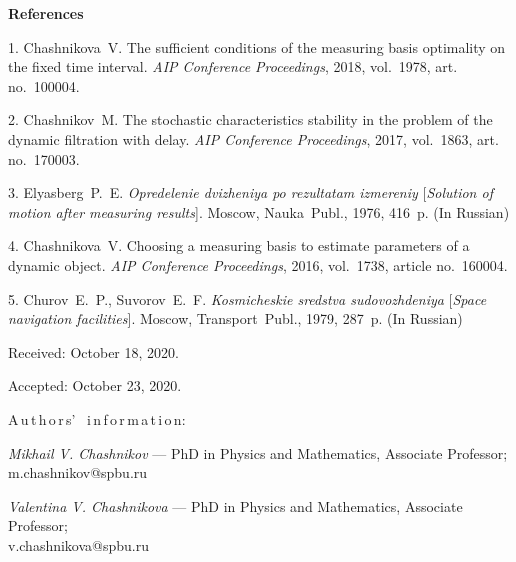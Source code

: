 

{\small



\vskip6mm

\noindent \textbf{References} }

\vskip 2mm

{\footnotesize



1. {\textnormal Chashnikova~V.} The sufficient conditions of the
measuring basis optimality on the fixed time interval.  {\itshape
AIP Conference Proceedings}, 2018, vol.~1978, art. no.~100004.

2. {\textnormal Chashnikov~M.} The stochastic characteristics
stability in the problem of the dynamic filtration with delay.
{\itshape AIP Conference Proceedings}, 2017, vol.~1863, art.
no.~170003.

3. {\textnormal Elyasberg~P.~E.} {\itshape Opredelenie dvizheniya
po rezultatam izmereniy} [{\itshape Solution of motion after
measuring results}]. Moscow, Nauka~Publ., 1976, 416~p. (In
Russian)

4. {\textnormal Chashnikova~V.} Choosing a measuring basis to
estimate parameters of a dynamic object.  {\itshape AIP Conference
Proceedings}, 2016, vol.~1738, article no.~160004.

5. {\textnormal Churov~E.~P., Suvorov~E.~F.} {\itshape
Kosmicheskie sredstva sudovozhdeniya} [{\itshape Space navigation
facilities}]. Moscow, Transport~Publ., 1979, 287~p. (In Russian)



\vskip 1.5mm

%


Received:  October 18, 2020.

Accepted: October 23, 2020.

\vskip 4.5mm%
A\,u\,t\,h\,o\,r\,s' \ i\,n\,f\,o\,r\,m\,a\,t\,i\,o\,n:

\vskip 2mm \textit{Mikhail V. Chashnikov} --- PhD in Physics and
Mathematics, Associate Professor;\\ m.chashnikov@spbu.ru

\vskip 2mm \textit{Valentina V. Chashnikova} --- PhD in Physics
and Mathematics, Associate Professor;\\ v.chashnikova@spbu.ru


}
